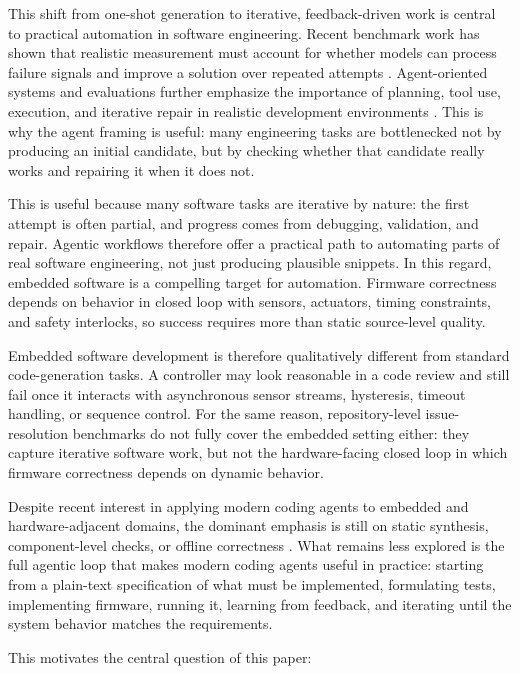 \documentclass[a4paper,fleqn]{cas-dc}
\begin{document}
This shift from one-shot generation to iterative, feedback-driven work is central to practical automation in software engineering. Recent benchmark work has shown that realistic measurement must account for whether models can process failure signals and improve a solution over repeated attempts \cite{swebench, swebench_verified}. Agent-oriented systems and evaluations further emphasize the importance of planning, tool use, execution, and iterative repair in realistic development environments \cite{sweagent, code_agent_eval}. This is why the agent framing is useful: many engineering tasks are bottlenecked not by producing an initial candidate, but by checking whether that candidate really works and repairing it when it does not.

This is useful because many software tasks are iterative by nature: the first attempt is often partial, and progress comes from debugging, validation, and repair. Agentic workflows therefore offer a practical path to automating parts of real software engineering, not just producing plausible snippets. In this regard, embedded software is a compelling target for automation. Firmware correctness depends on behavior in closed loop with sensors, actuators, timing constraints, and safety interlocks, so success requires more than static source-level quality.

Embedded software development is therefore qualitatively different from standard code-generation tasks. A controller may look reasonable in a code review and still fail once it interacts with asynchronous sensor streams, hysteresis, timeout handling, or sequence control. For the same reason, repository-level issue-resolution benchmarks do not fully cover the embedded setting either: they capture iterative software work, but not the hardware-facing closed loop in which firmware correctness depends on dynamic behavior.

Despite recent interest in applying modern coding agents to embedded and hardware-adjacent domains, the dominant emphasis is still on static synthesis, component-level checks, or offline correctness \cite{embedbench}. What remains less explored is the full agentic loop that makes modern coding agents useful in practice: starting from a plain-text specification of what must be implemented, formulating tests, implementing firmware, running it, learning from feedback, and iterating until the system behavior matches the requirements.

This motivates the central question of this paper:
\end{document}
